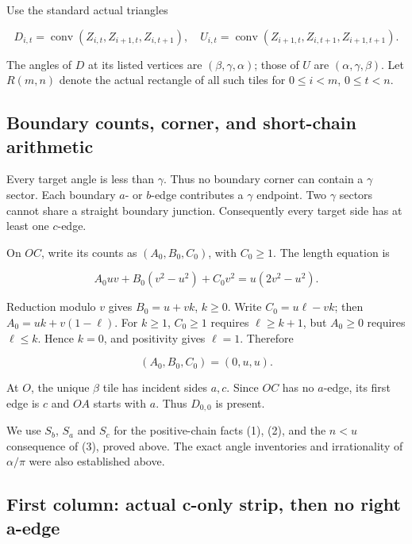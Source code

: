 \documentclass[
  11pt,
  a4paper,
]{article}
\begin{document}
Use the standard actual triangles

\[
D_{i,t}=\operatorname{conv}(Z_{i,t},Z_{i+1,t},Z_{i,t+1}),\quad
U_{i,t}=\operatorname{conv}(Z_{i+1,t},Z_{i,t+1},Z_{i+1,t+1}).
\]

The angles of \(D\) at its listed vertices are
\((\beta,\gamma,\alpha)\); those of \(U\) are \((\alpha,\gamma,\beta)\).
Let \(R(m,n)\) denote the actual rectangle of all such tiles for
\(0\le i<m\), \(0\le t<n\).

\hypertarget{boundary-counts-corner-and-short-chain-arithmetic}{%
\subsection{Boundary counts, corner, and short-chain
arithmetic}\label{boundary-counts-corner-and-short-chain-arithmetic}}

Every target angle is less than \(\gamma\). Thus no boundary corner can
contain a \(\gamma\) sector. Each boundary \(a\)- or \(b\)-edge
contributes a \(\gamma\) endpoint. Two \(\gamma\) sectors cannot share a
straight boundary junction. Consequently every target side has at least
one \(c\)-edge.

On \(OC\), write its counts as \((A_0,B_0,C_0)\), with \(C_0\ge1\). The
length equation is

\[
A_0uv+B_0(v^2-u^2)+C_0v^2=u(2v^2-u^2).
\]

Reduction modulo \(v\) gives \(B_0=u+vk\), \(k\ge0\). Write
\(C_0=u\ell-vk\); then \(A_0=uk+v(1-\ell)\). For \(k\ge1\), \(C_0\ge1\)
requires \(\ell\ge k+1\), but \(A_0\ge0\) requires \(\ell\le k\). Hence
\(k=0\), and positivity gives \(\ell=1\). Therefore

\[
\boxed{(A_0,B_0,C_0)=(0,u,u).}
\tag{B}
\]

At \(O\), the unique \(\beta\) tile has incident sides \(a,c\). Since
\(OC\) has no \(a\)-edge, its first edge is \(c\) and \(OA\) starts with
\(a\). Thus \(D_{0,0}\) is present.

We use \(S_b\), \(S_a\) and \(S_c\) for the positive-chain facts (1),
(2), and the \(n<u\) consequence of (3), proved above. The exact angle
inventories and irrationality of \(\alpha/\pi\) were also established
above.

\hypertarget{first-column-actual-c-only-strip-then-no-right-a-edge}{%
\subsection{First column: actual c-only strip, then no right
a-edge}\label{first-column-actual-c-only-strip-then-no-right-a-edge}}
\end{document}
